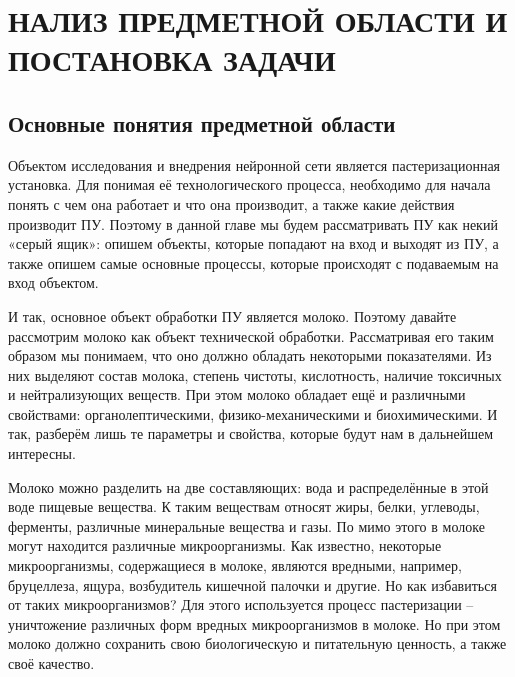 \sectionbreak \section*{
  \cyrillicfont 
  \fontsize{14pt}{24pt}\selectfont 
  \englishfont 
  \redline
  НАЛИЗ ПРЕДМЕТНОЙ ОБЛАСТИ И ПОСТАНОВКА ЗАДАЧИ
}

\titlespace
\subsection*{  \cyrillicfont 
  \fontsize{14pt}{24pt}\selectfont
  \englishfont
  \redline
  Основные понятия предметной области
} 
\titlespace

{\cyrillicfont 
\fontsize{13pt}{16.25pt}\selectfont 
\englishfont 

  \par \redline Объектом исследования и внедрения нейронной сети является пастеризационная установка. Для понимая её технологического процесса, необходимо для начала понять с чем она работает и что она производит, а также какие действия производит ПУ. Поэтому в данной главе мы будем рассматривать ПУ как некий «серый ящик»: опишем объекты, которые попадают на вход и выходят из ПУ, а также опишем самые основные процессы, которые происходят с подаваемым на вход объектом. 

  \par \redline И так, основное объект обработки ПУ является молоко. Поэтому давайте рассмотрим молоко как объект технической обработки. Рассматривая его таким образом мы понимаем, что оно должно обладать некоторыми показателями. Из них выделяют состав молока, степень чистоты, кислотность, наличие токсичных и нейтрализующих веществ. При этом молоко обладает ещё и различными свойствами: органолептическими, физико-механическими и биохимическими. И так, разберём лишь те параметры и свойства, которые будут нам в дальнейшем интересны.

  \par \redline Молоко можно разделить на две составляющих: вода и распределённые в этой воде пищевые вещества. К таким веществам относят жиры, белки, углеводы, ферменты, различные минеральные вещества и газы. По мимо этого в молоке могут находится различные микроорганизмы. Как известно, некоторые микроорганизмы, содержащиеся в молоке, являются вредными, например, бруцеллеза, ящура, возбудитель кишечной палочки и другие. Но как избавиться от таких микроорганизмов?  Для этого используется процесс пастеризации – уничтожение различных форм вредных микроорганизмов в молоке. Но при этом молоко должно сохранить свою биологическую и питательную ценность, а также своё качество. 

}
